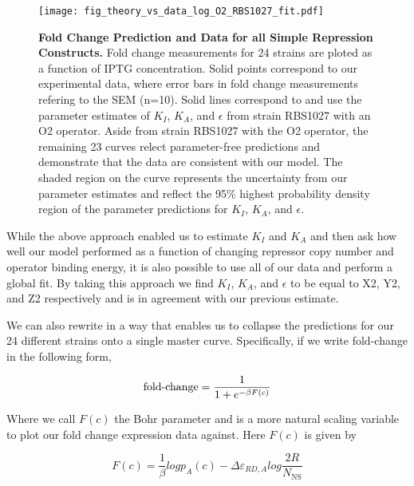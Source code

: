 \begin{figure}[h]
	\centering \texttt{[image: fig\_theory\_vs\_data\_log\_O2\_RBS1027\_fit.pdf]}
	\caption{{\bf Fold Change Prediction and Data for all Simple Repression Constructs.}  Fold change measurements for 24 strains are ploted as a function of IPTG concentration. Solid points correspond to our experimental data, where error bars in fold change measurements refering to the SEM (n=10). Solid lines correspond to \eref[eq7] and use the parameter estimates of $K_I$, $K_A$, and $\epsilon$ from strain RBS1027 with an O2 operator. Aside from strain RBS1027 with the O2 operator, the remaining 23 curves relect parameter-free predictions and demonstrate that the data are consistent with our model. The shaded region on the curve represents the uncertainty from our parameter estimates and reflect the 95\% highest probability density region of the parameter predictions for $K_I$, $K_A$, and $\epsilon$.}
	\label{fig_result2}
\end{figure}

While the above approach enabled us to estimate $K_I$ and $K_A$ and then ask how well our model performed as a function of changing repressor copy number and operator binding energy, it is also possible to use all of our data and perform a global fit. By taking this approach we find  $K_I$, $K_A$, and $\epsilon$ to be equal to X2, Y2, and Z2 respectively and is in agreement with our previous estimate.

 We can also rewrite \eref[eq7] in a way that enables us to collapse the predictions for our 24 different strains onto a single master curve. Specifically, if we write fold-change in the following form,

\begin{equation}\label{eq8}
\operatorname{fold-change}= \frac{1}{1+e^{-\beta F(c)}}
\end{equation}

Where we call $F(c)$ the Bohr parameter \cite{Phillips2016} and is a more natural scaling variable to plot our fold change expression data against. Here $F(c)$ is given by

\begin{equation}\label{eq9}
F(c) =  \frac{1}{\beta} log p_A(c)
- \Delta\varepsilon_{RD,A} 
log \frac{2R}{N_{\text{NS}}} 
\end{equation}

